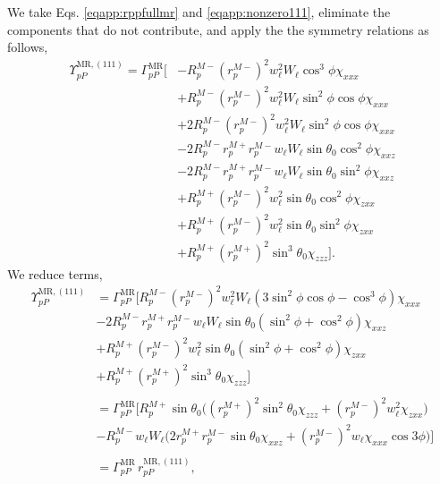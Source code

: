 We take Eqs. \eqref{eqapp:rppfullmr} and \eqref{eqapp:nonzero111}, eliminate the
components that do not contribute, and apply the the symmetry relations as
follows,
\begin{equation*}
\begin{split}
\Upsilon^{\mathrm{MR},(111)}_{pP} =
\Gamma^{\mathrm{MR}}_{pP}
\bigg[
&- R^{M-}_{p}\left(r^{M-}_{p}\right)^{2}w^{2}_{\ell}W_{\ell}
   \cos^{3}\phi\chi_{xxx}\\
&+ R^{M-}_{p}\left(r^{M-}_{p}\right)^{2}w^{2}_{\ell}W_{\ell}
   \sin^{2}\phi\cos\phi\chi_{xxx}\\
&+ 2R^{M-}_{p}\left(r^{M-}_{p}\right)^{2}w^{2}_{\ell}W_{\ell}
   \sin^{2}\phi\cos\phi\chi_{xxx}\\
&- 2R^{M-}_{p}r^{M+}_{p}r^{M-}_{p}w_{\ell}W_{\ell}
   \sin\theta_{0}\cos^{2}\phi\chi_{xxz}\\
&- 2R^{M-}_{p}r^{M+}_{p}r^{M-}_{p}w_{\ell}W_{\ell}
   \sin\theta_{0}\sin^{2}\phi\chi_{xxz}\\
&+ R^{M+}_{p}\left(r^{M-}_{p}\right)^{2}w^{2}_{\ell}
   \sin\theta_{0}\cos^{2}\phi\chi_{zxx}\\
&+ R^{M+}_{p}\left(r^{M-}_{p}\right)^{2}w^{2}_{\ell}
   \sin\theta_{0}\sin^{2}\phi\chi_{zxx}\\
&+ R^{M+}_{p}\left(r^{M+}_{p}\right)^{2}\sin^{3}\theta_{0}\chi_{zzz}
\bigg].
\end{split}
\end{equation*}
We reduce terms,
\begin{equation*}
\begin{split}
\Upsilon^{\mathrm{MR},(111)}_{pP} &=
\Gamma^{\mathrm{MR}}_{pP}
\big[
R^{M-}_{p}\left(r^{M-}_{p}\right)^{2}w^{2}_{\ell}W_{\ell}
  (3\sin^{2}\phi\cos\phi - \cos^{3}\phi)\chi_{xxx}\\
&- 2R^{M-}_{p}r^{M+}_{p}r^{M-}_{p}w_{\ell}W_{\ell}\sin\theta_{0}
  (\sin^{2}\phi + \cos^{2}\phi)\chi_{xxz}\\
&+ R^{M+}_{p}\left(r^{M-}_{p}\right)^{2}w^{2}_{\ell}\sin\theta_{0}
  (\sin^{2}\phi + \cos^{2}\phi)\chi_{zxx}\\
&+ R^{M+}_{p}\left(r^{M+}_{p}\right)^{2}\sin^{3}\theta_{0}\chi_{zzz}
\big]\\\\
&=
\Gamma^{\mathrm{MR}}_{pP}
\bigg[
R^{M+}_{p}\sin\theta_{0}
\Big(
  \left(r^{M+}_{p}\right)^{2}\sin^{2}\theta_{0}\chi_{zzz}
+ \left(r^{M-}_{p}\right)^{2}w^{2}_{\ell}\chi_{zxx}
\Big)\\
&- R^{M-}_{p}w_{\ell}W_{\ell}
\Big(
  2r^{M+}_{p}r^{M-}_{p}\sin\theta_{0}\chi_{xxz}
+ \left(r^{M-}_{p}\right)^{2}w_{\ell}\chi_{xxx}\cos3\phi
\Big)
\bigg]\\\\
& = \Gamma^{\mathrm{MR}}_{pP}\,r^{\mathrm{MR},(111)}_{pP},
\end{split}
\end{equation*}

